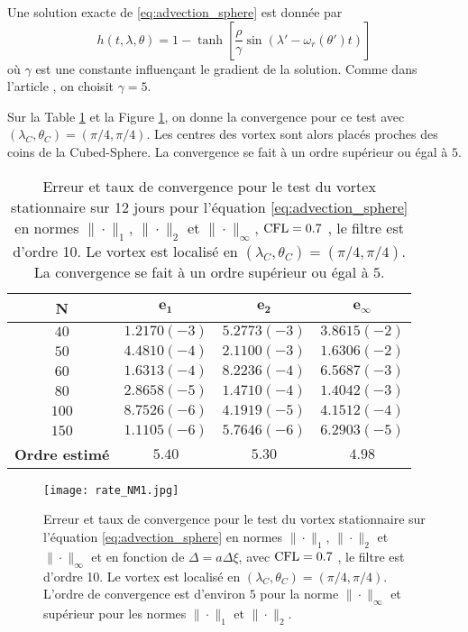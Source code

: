 Une solution exacte de \eqref{eq:advection_sphere} est donnée par
\begin{equation}
h(t, \lambda, \theta) = 1 - \tanh \left[ \dfrac{\rho}{\gamma} \sin (\lambda' - \omega_r (\theta') t) \right]
\label{eq:NM_solexacte}
\end{equation}
où $\gamma$ est une constante influençant le gradient de la solution. Comme dans l'article \cite{Nair2002}, on choisit $\gamma = 5$.

Sur la Table \ref{tab:rate1_NM} et la Figure \ref{fig:rate1_NM}, on donne la convergence pour ce test avec $(\lambda_C, \theta_C)=(\pi /4 , \pi /4)$. Les centres des vortex sont alors placés proches des coins de la Cubed-Sphere. La convergence se fait à un ordre supérieur ou égal à $5$.

\begin{table}[htbp]
\begin{center}
\begin{tabular}{|c||c|c|c|}
\hline
\textbf{N}  & $\mathbf{e_1}$ & $\mathbf{e_2}$ & $\mathbf{e_{\infty}}$\\
\hline
\hline
$40$  & $1.2170 (-3)$ & $5.2773 (-3)$ & $3.8615 (-2)$ \\
$50$  & $4.4810 (-4)$ & $2.1100 (-3)$ & $1.6306 (-2)$ \\
$60$  & $1.6313 (-4)$ & $8.2236 (-4)$ & $6.5687 (-3)$ \\
$80$  & $2.8658 (-5)$ & $1.4710 (-4)$ & $1.4042 (-3)$ \\
$100$  & $8.7526 (-6)$ & $4.1919 (-5)$ & $4.1512 (-4)$ \\
$150$  & $1.1105 (-6)$ & $5.7646 (-6)$ & $6.2903 (-5)$ \\
\hline 
\hline
\textbf{Ordre estimé}& $5.40$ & $5.30$ & $4.98$\\
\hline
\end{tabular}
\end{center}
\caption{Erreur et taux de convergence pour le test du vortex stationnaire sur 12 jours pour l'équation \eqref{eq:advection_sphere} en normes $\| \cdot\|_1$, $\| \cdot\|_2$ et $\| \cdot\|_{\infty}$, $\text{CFL} = 0.7$ \cite{Nair2002}, le filtre est d'ordre 10. Le vortex est localisé en $(\lambda_C, \theta_C)=(\pi /4 , \pi /4)$. La convergence se fait à un ordre supérieur ou égal à $5$.}
\label{tab:rate1_NM}
\end{table} 

\begin{figure}[htbp]
\begin{center}
\texttt{[image: rate\_NM1.jpg]}
\end{center}
\caption{Erreur et taux de convergence pour le test du vortex stationnaire sur l'équation \eqref{eq:advection_sphere} en normes $\| \cdot\|_1$, $\| \cdot\|_2$ et $\| \cdot\|_{\infty}$ et en fonction de $\Delta = a \Delta \xi$, avec $\text{CFL} = 0.7$ \cite{Nair2002}, le filtre est d'ordre 10. Le vortex est localisé en $(\lambda_C, \theta_C)=(\pi /4 , \pi /4)$. L'ordre de convergence est d'environ $5$ pour la norme $\| \cdot \|_{\infty}$ et supérieur pour les normes $\| \cdot \|_{1}$ et $\| \cdot \|_{2}$.}
\label{fig:rate1_NM}
\end{figure} 

